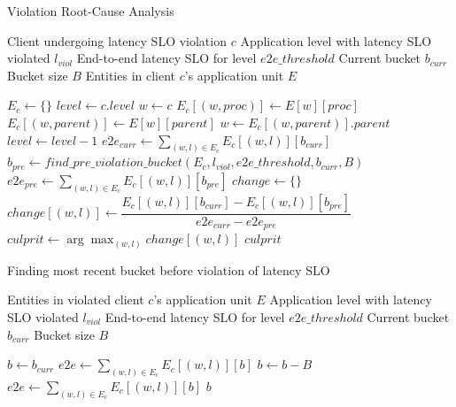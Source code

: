 \begin{algorithm}
\caption{Violation Root-Cause Analysis}
\label{algo:violation_root_cause}
\begin{algorithmic}[1]
\Require Client undergoing latency SLO violation $c$
\Require Application level with latency SLO violated $l_{viol}$
\Require End-to-end latency SLO for level $e2e\_threshold$
\Require Current bucket $b_{curr}$
\Require Bucket size $B$
\Require Entities in client $c$'s application unit $E$

\State $E_c \gets \{\}$ 
\State $level \gets c.level$
\State $w \gets c$
 
    \State $E_c [\left( w, proc \right)] \gets E[w][proc]$
        \State $E_c [\left( w, parent \right)] \gets E[w][parent]$
        \State $w \gets E_c [\left( w, parent \right)].parent$
    \EndIf
    \State $level \gets level - 1$
\EndWhile
\State $e2e_{curr} \gets \sum_{\left( w, l\right) \in E_c}{E_c[\left( w, l\right)][b_{curr}]}$   
\State $b_{pre} \gets find\_pre\_violation\_bucket \left( E_c, l_{viol}, e2e\_threshold, b_{curr}, B \right)$
\State $e2e_{pre} \gets \sum_{\left( w, l\right) \in E_c}{E_c[\left( w, l\right)][b_{pre}]}$    
\State $change \gets \{\}$  
    \State $change [\left(w, l\right)] \gets \dfrac{E_c[\left( w, l \right)][b_{curr}] - E_c[\left( w, l \right)][b_{pre}]}{e2e_{curr} - e2e_{pre}}$
\EndFor
\State $culprit \gets \arg\max_{\left(w, l\right)} change[\left( w, l\right)]$
\State \Return $culprit$
\end{algorithmic}
\end{algorithm}


\begin{algorithm}
\caption{Finding most recent bucket before violation of latency SLO}
\begin{algorithmic}[1]
\Require Entities in violated client $c$'s application unit $E$
\Require Application level with latency SLO violated $l_{viol}$
\Require End-to-end latency SLO for level $e2e\_threshold$
\Require Current bucket $b_{curr}$
\Require Bucket size $B$

\State $b \gets b_{curr}$
\State $e2e \gets \sum_{\left( w, l\right) \in E_c}{E_c[\left( w, l\right)][b]}$
    \State $b \gets b - B$ 
    \State $e2e \gets \sum_{\left( w, l\right) \in E_c}{E_c[\left( w, l\right)][b]}$
\EndWhile
\State \Return $b$
\end{algorithmic}
\end{algorithm}

